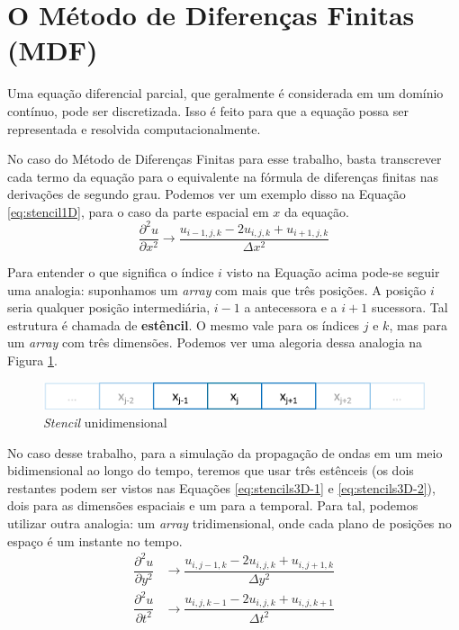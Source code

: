 \section{O Método de Diferenças Finitas (MDF)}

Uma equação diferencial parcial, que geralmente é considerada em um domínio
contínuo, pode ser discretizada. Isso é feito para que a equação possa ser
representada e resolvida computacionalmente.

No caso do Método de Diferenças	Finitas para esse trabalho, basta
transcrever cada termo da equação para o equivalente na fórmula de
diferenças finitas nas derivações de segundo grau. Podemos
ver um exemplo disso na Equação \ref{eq:stencil1D}, para o caso da parte
espacial em $x$ da equação.
\begin{equation}
	\dfrac{\partial^2 u}{\partial x^2} \xrightarrow{} \dfrac{u_{i-1,j,k} -
		2u_{i,j,k} + u_{i+1,j,k}}{\Delta x^2}
	\label{eq:stencil1D}
\end{equation}

Para entender o que
significa o índice $i$ visto na Equação acima pode-se seguir uma analogia:
suponhamos um \textit{array} com mais que três posições. A posição $i$ seria
qualquer posição intermediária, $i-1$ a antecessora e a $i+1$ sucessora. Tal
estrutura é chamada de \textbf{estêncil}. O mesmo vale para os índices
$j$ e $k$, mas para um \textit{array} com três dimensões. Podemos ver
uma alegoria dessa analogia na Figura \ref{fig:stencil1D}.
\begin{figure}[H]
	\centering
	\label{fig:stencil1D}
	\includegraphics[scale=.5, width=\textwidth]{chapters/chp2/images/1d-stencil.png}
	\caption{\textit{Stencil} unidimensional \cite{image:1d-stencil}}
\end{figure}

No caso desse trabalho, para a simulação da propagação de ondas em um
meio bidimensional ao longo do tempo, teremos que usar três estênceis
(os dois restantes podem ser vistos nas Equações
\ref{eq:stencils3D-1} e \ref{eq:stencils3D-2}), dois para as dimensões
espaciais e um para a temporal. Para tal,
podemos utilizar outra analogia: um \textit{array} tridimensional, onde cada
plano de posições no espaço é um instante no tempo.
\begin{align}
	\dfrac{\partial^2 u}{\partial y^2} & \xrightarrow{} \dfrac{u_{i,j-1,k} - 2u_{i,j,k} +
		u_{i,j+1,k}}{\Delta y^2}
	\label{eq:stencils3D-1}
	\\
	\dfrac{\partial^2 u}{\partial t^2} & \xrightarrow{} \dfrac{u_{i,j,k-1} - 2u_{i,j,k} +
		u_{i,j,k+1}}{\Delta t^2}
	\label{eq:stencils3D-2}
\end{align}

